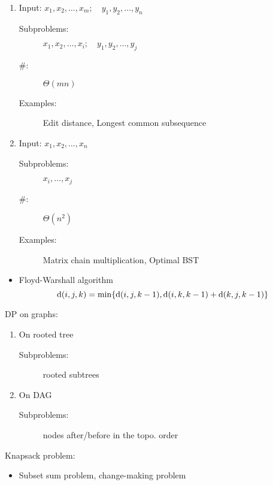 \begin{frame}{}
  \centerline{}

  \vspace{0.50cm}
  \begin{enumerate}
    \item Input: $x_{1}, x_{2}, \dots, x_{m}; \quad y_{1}, y_{2}, \dots, y_{n}$
      \begin{description}
	\item[Subproblems:] $x_{1}, x_{2}, \dots, x_{i}; \quad y_{1}, y_{2}, \dots, y_{j}$
	\item[\#:] $\Theta(mn)$
	\item[Examples:] Edit distance, Longest common subsequence
      \end{description}
      \pause
      \vspace{0.30cm}
    \item Input: $x_{1}, x_{2}, \dots, x_{n}$
      \begin{description}
	\item[Subproblems:] $x_{i}, \dots, x_{j}$
	\item[\#:] $\Theta(n^{2})$
	\item[Examples:] Matrix chain multiplication, Optimal BST
      \end{description}
  \end{enumerate}
\end{frame}
\begin{frame}{}
  \centerline{}

  \vspace{0.50cm}
  \begin{itemize}
    \item Floyd-Warshall algorithm
      \[
	\text{d}(i,j,k) = \min \{\text{d}(i,j,k-1), \text{d}(i,k,k-1) + \text{d}(k,j,k-1)\}
      \]
  \end{itemize}

  \pause
  DP on graphs:
  \begin{enumerate}
    \item On rooted tree
      \begin{description}
	\item[Subproblems:] rooted subtrees
      \end{description}
    \item On DAG
      \begin{description}
	\item[Subproblems:] nodes after/before in the topo. order
      \end{description}
  \end{enumerate}

  \pause
  \vspace{0.30cm}
  Knapsack problem:
  \begin{itemize}
    \item Subset sum problem, change-making problem
  \end{itemize}
\end{frame}

